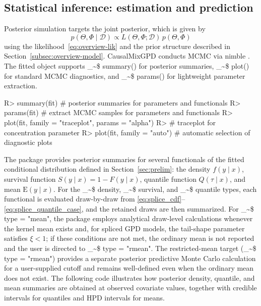 \documentclass[preprint,12pt,authoryear]{elsarticle}
\makeatletter
\newcommand{\pkg}[1]{\textsf{#1}}
\newcommand\code{\bgroup\@makeother\_\@makeother\~\@makeother\$\@codex}
\def\@codex#1{{\normalfont\ttfamily\hyphenchar\font=-1 #1}\egroup}
\renewenvironment{Schunk}{\vspace{0pt}}{\vspace{-0.1\baselineskip}}
\makeatother
\begin{document}
\subsection{Statistical inference: estimation and prediction}

Posterior simulation targets the joint posterior, which is given by
$$p(\Theta,\Phi\mid \mathcal{D}) \propto L(\Theta,\Phi;\mathcal{D})\,p(\Theta,\Phi)$$
using the likelihood~\eqref{eq:overview-lik} and the prior structure
described in Section~\ref{subsec:overview-model}.
\pkg{CausalMixGPD} conducts MCMC via \pkg{nimble}
\citep{nimble_method,nimble_pkg}.  The fitted object supports \code{summary()} for
posterior summaries, \code{plot()} for standard MCMC diagnostics, and
\code{params()} for lightweight parameter extraction.

\begin{Schunk}
\begin{Sinput}
R> summary(fit)  # posterior summaries for parameters and functionals
R> params(fit)   # extract MCMC samples for parameters and functionals
R> plot(fit,  family = "traceplot",  params = "alpha")
R> # traceplot for concentration parameter
R> plot(fit, family = "auto")  # automatic selection of diagnostic plots
\end{Sinput}
\end{Schunk}

The package provides posterior summaries for several functionals of the
fitted conditional distribution defined in
Section~\ref{sec:prelim}: the density $f(y\mid x)$, survival function
$S(y\mid x) = 1 - F(y\mid x)$, quantile function $Q(\tau\mid x)$,
and mean $\mathrm{E}(y\mid x)$.  For the \code{density},
\code{survival}, and \code{quantile} types, each functional is
evaluated draw-by-draw from
\eqref{eq:splice_cdf}--\eqref{eq:splice_quantile_case}, and the
retained draws are then summarized.  For \code{type = "mean"}, the
package employs analytical draw-level calculations whenever the kernel
mean exists and, for spliced GPD models, the tail-shape parameter
satisfies $\xi < 1$; if these conditions are not met, the ordinary
mean is not reported and the user is directed to
\code{type = "rmean"}.  The restricted-mean target
(\code{type = "rmean"}) provides a separate posterior predictive Monte
Carlo calculation for a user-supplied cutoff and remains well-defined
even when the ordinary mean does not exist.  The following code
illustrates how posterior density, quantile, and mean summaries are
obtained at observed covariate values, together with credible intervals
for quantiles and HPD intervals for means.
\end{document}
